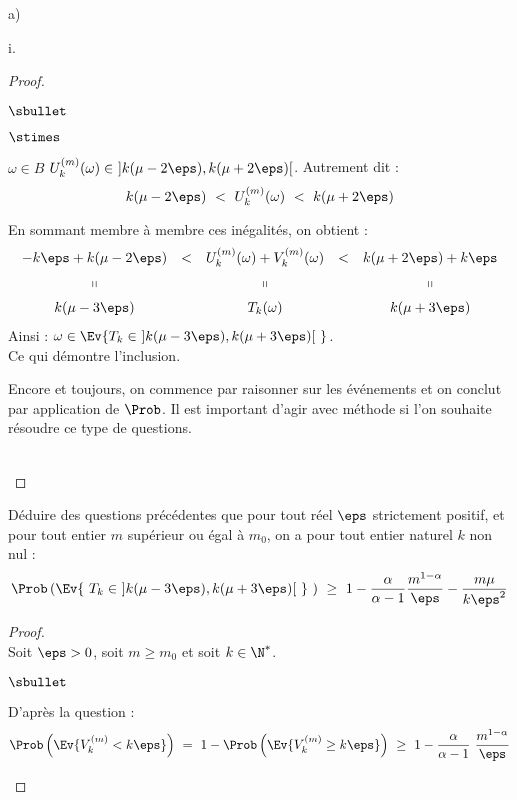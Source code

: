 \begin{liste}{a)}
\begin{nonoliste}{i.}
\begin{proof}
\begin{noliste}{$\sbullet$}
\begin{noliste}{$\stimes$}
        \item $\omega \in B$ \ie $U_{k}^{(m)}(\omega) \in \ ] k(\mu -
          2 \eps), k(\mu + 2 \eps)[ $. Autrement dit :
          \[
          k(\mu - 2 \eps) \ < \ U_{k}^{(m)}(\omega) \ < \ k(\mu + 2
          \eps)
          \]
        \end{noliste}
        En sommant membre à membre ces inégalités, on obtient :
        \[
        \begin{array}{ccccc}
          - k\eps + k(\mu - 2 \eps) & < & U_{k}^{(m)}(\omega) +
          V_{k}^{(m)}(\omega) & < & k(\mu + 2 \eps) + k\eps
          \\[.2cm]
          \shortparallel & & \shortparallel & & \shortparallel
          \\[.2cm]
          k(\mu - 3 \eps) & & T_k(\omega) & & k(\mu + 3 \eps)
        \end{array}
        \]
        Ainsi : $\omega \in \Ev{T_k \in \ ]k(\mu - 3 \eps), k(\mu + 3
          \eps)[ \ }$.\\
        Ce qui démontre l'inclusion.
      \end{noliste}
      \conc{On a donc bien : $\Prob(\Ev{ T_{k} \in \ ]k(\mu - 3 \eps),
          k(\mu + 3 \eps)[ \ }) \ \geq \ \Prob(A \cap B) \ \geq \
        \Prob(A) + \Prob(B) - 1$.}%
      \begin{remark}%
        Encore et toujours, on commence par raisonner sur les
        événements et on conclut par application de $\Prob$. Il est
        important d'agir avec méthode si l'on souhaite résoudre ce
        type de questions.
      \end{remark}~\\[-1.4cm]
    \end{proof}


    \newpage


  \item Déduire des questions précédentes que pour tout réel $\eps$
    strictement positif, et pour tout entier $m$ supérieur ou égal à
    $m_{0}$, on a pour tout entier naturel $k$ non nul :
    \[
    \Prob\left(\Ev{\ T_{k} \in \ ]k(\mu - 3 \eps), k(\mu + 3 \eps)[ \
      } \ \right) \ \geq \ 1 - \dfrac{\alpha}{\alpha-1}
    \dfrac{m^{1-\alpha}}{\eps} - \dfrac{m \mu}{k \eps^{2}}
    \]

    \begin{proof}~\\%
      Soit $\eps > 0$, soit $m \geq m_0$ et soit $k \in \N^*$.
      \begin{noliste}{$\sbullet$}
      \item D'après la question \itbf{9.f)ii.} :
        \[
        \Prob\left(\Ev{ V_{k}^{(m)} < k \eps}\right) \ = \ 1 -
        \Prob\left(\Ev{ V_{k}^{(m)} \geq k \eps } \right) \ \geq \ 1 -
        \dfrac{\alpha}{\alpha-1} \ \dfrac{m^{1-\alpha}}{\eps}
        \]


\end{noliste}
\end{proof}
\end{nonoliste}
\end{liste}
